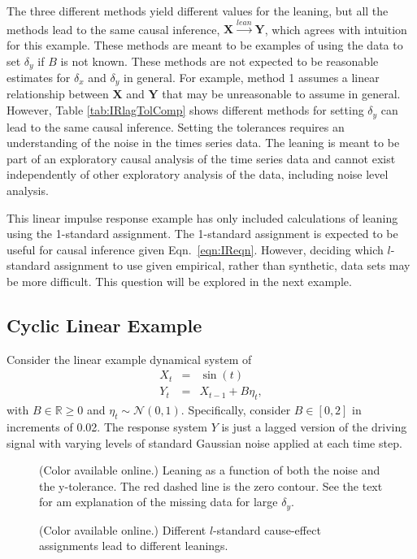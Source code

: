 \documentclass[a4paper,11pt,twocolumn]{article}
\begin{document}
The three different methods yield different values for the leaning, but all the methods lead to the same causal inference, $\mathbf{X}\xrightarrow{lean}\mathbf{Y}$, which agrees with intuition for this example.  These methods are meant to be examples of using the data to set $\delta_y$ if $B$ is not known.  These methods are not expected to be reasonable estimates for $\delta_x$ and $\delta_y$ in general.  For example, method 1 assumes a linear relationship between $\mathbf{X}$ and $\mathbf{Y}$ that may be unreasonable to assume in general.  However, Table \ref{tab:IRlagTolComp} shows different methods for setting $\delta_y$ can lead to the same causal inference.  Setting the tolerances requires an understanding of the noise in the times series data.  The leaning is meant to be part of an exploratory causal analysis of the time series data and cannot exist independently of other exploratory analysis of the data, including noise level analysis.  

This linear impulse response example has only included calculations of leaning using the 1-standard assignment.  The 1-standard assignment is expected to be useful for causal inference given Eqn.\ \ref{eqn:IReqn}.  However, deciding which $l$-standard assignment to use given empirical, rather than synthetic, data sets may be more difficult.  This question will be explored in the next example.

\subsection{Cyclic Linear Example}
Consider the linear example dynamical system of
\begin{eqnarray}
\label{eq:linearex}
X_t &=& \sin(t)\\
Y_t &=& X_{t-1}+B\eta_t,
\end{eqnarray}
with $B\in\mathbb{R}\ge 0$ and $\eta_t\sim\mathcal{N}\left(0,1\right)$.  Specifically, consider $B\in[0,2]$ in increments of 0.02.  The response system $Y$ is just a lagged version of the driving signal with varying levels of standard Gaussian noise applied at each time step.  
\begin{figure}[ht]
\caption{(Color available online.) Leaning as a function of both the noise and the y-tolerance.  The red dashed line is the zero contour.  See the text for am explanation of the missing data for large $\delta_y$.}
\end{figure}
\begin{figure}[ht]
\caption{(Color available online.) Different $l$-standard cause-effect assignments lead to different leanings.}
\end{figure}
\end{document}
